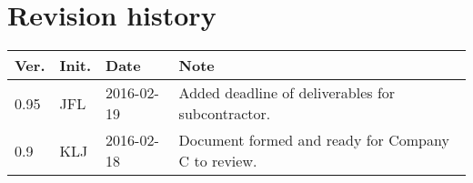 \chapter*{Revision history}
\label{app:rev_his}


\begin{tabular}{b{1cm} b{1cm} b{2cm} b{8cm}}
    \textbf{Ver.} & \textbf{Init.} & \textbf{Date} & \textbf{Note} \\
    \hline
    0.95 & JFL & 2016-02-19 & Added deadline of deliverables for subcontractor. \\
    0.9 & KLJ & 2016-02-18 & Document formed and ready for Company C to review. \\
\end{tabular}
